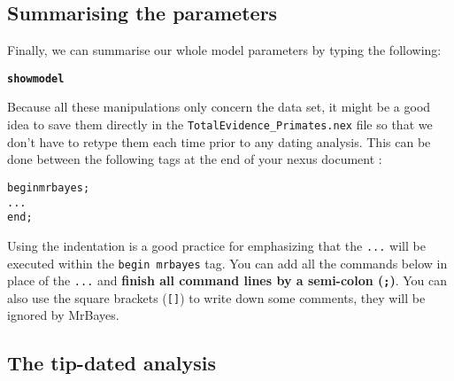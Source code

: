 \documentclass{article}\usepackage[]{graphicx}\usepackage[]{color}
\makeatletter
\newcommand{\hlkwd}[1]{\textcolor[rgb]{0.737,0.353,0.396}{\textbf{#1}}}%
\newenvironment{kframe}{%
 \def\at@end@of@kframe{}%
 \ifinner\ifhmode%
  \def\at@end@of@kframe{\end{minipage}}%
  \begin{minipage}{\columnwidth}%
 \fi\fi%
 \def\FrameCommand##1{\hskip\@totalleftmargin \hskip-\fboxsep
 \colorbox{shadecolor}{##1}\hskip-\fboxsep
     \hskip-\linewidth \hskip-\@totalleftmargin \hskip\columnwidth}%
 \MakeFramed {\advance\hsize-\width
   \@totalleftmargin\z@ \linewidth\hsize
   \@setminipage}}%
 {\par\unskip\endMakeFramed%
 \at@end@of@kframe}
\newenvironment{knitrout}{}{} %
\makeatother
\begin{document}
\subsection{Summarising the parameters}
Finally, we can summarise our whole model parameters by typing the following:
\begin{knitrout}
\color{fgcolor}\begin{kframe}
\begin{alltt}
\hlkwd{showmodel}
\end{alltt}
\end{kframe}
\end{knitrout}

Because all these manipulations only concern the data set, it might be a good idea to save them directly in the \texttt{TotalEvidence\_Primates.nex} file so that we don't have to retype them each time prior to any dating analysis.
This can be done between the following tags at the end of your nexus document :

\begin{knitrout}
\color{fgcolor}\begin{kframe}
\begin{alltt}
begin mrbayes;
    ...
end;
\end{alltt}
\end{kframe}
\end{knitrout}

\noindent Using the indentation is a good practice for emphasizing that the \texttt{...} will be executed within the \texttt{begin mrbayes} tag.
You can add all the commands below in place of the \texttt{...} and \textbf{finish all command lines by a semi-colon (\texttt{;})}.
You can also use the square brackets (\texttt{[]}) to write down some comments, they will be ignored by MrBayes.

\subsection{The tip-dated analysis}
\end{document}
